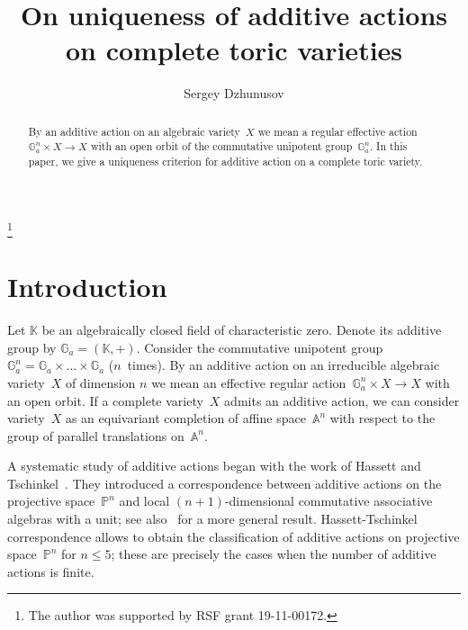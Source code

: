 \documentclass[a4paper,reqno,12pt]{amsart}
\def\A  {\mathbb A}
\def\Ga  {\mathbb G_a}
\def\K  {\mathbb K}
\def\P  {\mathbb P}
\theoremstyle{definition}
\begin{document}
\sloppy

\title{On uniqueness of additive actions on complete toric varieties}
\author{Sergey Dzhunusov}
\address{National Research University Higher School of Economics, Faculty of Computer Science, Pokrovsky boulevard 11, Moscow, 109028 Russia}
\renewcommand{\address}{{
    \footnotesize
    \textsc{Moscow}\par\nopagebreak
    \textit{E-mail} : \texttt{dzhunusov398@gmail.com}
  }}

\date{}
\thanks{The author was supported by RSF grant 19-11-00172.}
\begin{abstract}
  By an additive action on an algebraic variety~$X$ we mean a regular effective action~$\mathbb{G}_a^n\times X\to X$ with an open orbit of the commutative unipotent group~$\mathbb{G}_a^n$.
  In this paper, we give a uniqueness criterion for additive action on a complete toric variety.

\end{abstract}


\maketitle

\section{Introduction}
Let $\K$ be an algebraically closed field of characteristic zero.
Denote its additive group by $\Ga=(\K,+)$.
Consider the commutative unipotent group~$\Ga^n=\Ga\times\ldots\times\Ga$ ($n$~times).
By an additive action on an irreducible algebraic variety~$X$ of dimension $n$ we mean an effective regular action~$\Ga^n\times X\to X$ with an open orbit.
If a complete variety~$X$ admits an additive action, we can consider variety~$X$ as an equivariant completion of affine space~$\A^n$ with respect to the group of parallel translations on~$\A^n$. 

A systematic study of additive actions began with the work of Hassett and Tschinkel~\cite{HT}.
They introduced a correspondence between additive actions on the projective space~$\P^n$ and local $(n+1)$-dimensional commutative associative algebras with a unit; see also~\cite[Proposition~5.1]{KL} for a more general result. 
Hassett-Tschinkel correspondence allows to obtain the classification of additive actions on projective space~$\P^n$ for $n \leq 5$; these are precisely the cases when the number of additive actions is finite.
\end{document}
